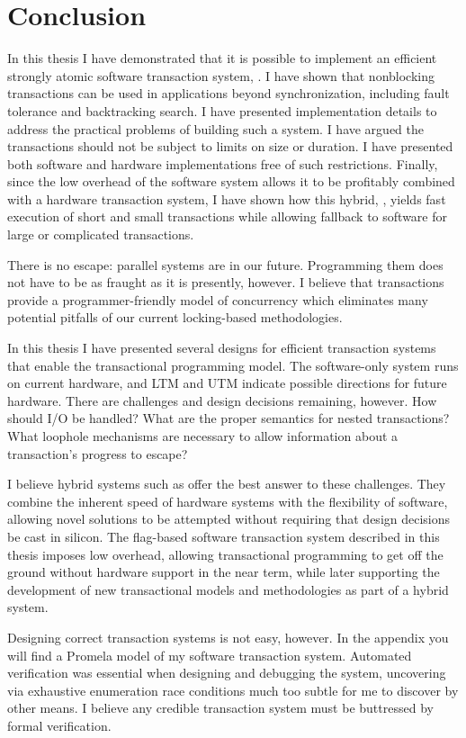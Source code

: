 \chapter{Conclusion}\label{cha:concl}

In this thesis I have demonstrated that it is possible to implement an
efficient strongly atomic software transaction system, \apex.
I have shown that
nonblocking transactions can be used in applications beyond
synchronization, including fault tolerance and backtracking search.  I
have presented implementation details to address the practical
problems of building such a system.  I have argued the transactions
should not be subject to limits on size or duration. I have presented
both software and hardware implementations free of such restrictions.
Finally, since the low overhead of the \apex software system allows it to be
profitably combined with a hardware transaction system, I have shown
how this hybrid, \hyx, yields fast execution of short and small transactions
while allowing fallback to software for large or complicated
transactions.

There is no escape: parallel systems are in our future.
Programming them does not have to be as fraught as it is presently, however.
I believe that transactions provide a programmer-friendly model
of concurrency which eliminates many potential pitfalls of our
current locking-based methodologies.

In this thesis I have presented several designs for efficient
transaction systems that enable the
transactional programming model.  The \apex software-only system runs on
current hardware, and LTM and UTM indicate possible directions for future
hardware.  There are challenges and design decisions
remaining, however.  How should I/O be handled?  What are the proper semantics
for nested transactions?  What loophole mechanisms are necessary to
allow information about a transaction's progress to escape?

I believe hybrid systems such as \hyx offer the best answer to these
challenges.  They
combine the
inherent speed of hardware systems with the
flexibility of software, allowing novel solutions to be attempted
without requiring that design decisions be cast in silicon.  The
flag-based \apex software transaction system described in this thesis
imposes low overhead, allowing transactional
programming to get off the ground without hardware support in the near
term, while later supporting the development of new transactional models and
methodologies as part of a hybrid system.

Designing correct transaction systems is not easy, however.  In the
appendix you will find a Promela model of my software transaction
system.  Automated verification was essential when designing and
debugging the system, uncovering via exhaustive enumeration race
conditions much too subtle for me to discover by other means.  I
believe any credible transaction system must be buttressed by formal
verification.
